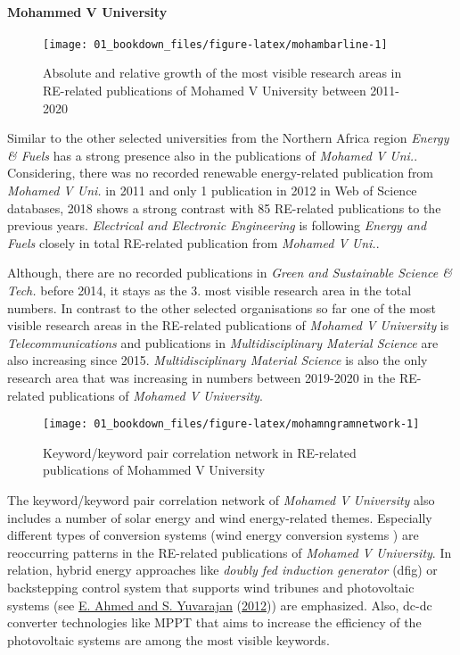 \documentclass[12pt,twoside]{report}
\let\oldparagraph\paragraph
\renewcommand{\paragraph}[1]{\oldparagraph{#1}\mbox{}}
\begin{document}
\hypertarget{mohammed-v-university}{%
\paragraph{Mohammed V University}\label{mohammed-v-university}}

\begin{figure}
\texttt{[image: 01\_bookdown\_files/figure-latex/mohambarline-1]} \caption{Absolute and relative growth of the most visible research areas in RE-related publications of Mohamed V University between 2011-2020}\label{fig:mohambarline}
\end{figure}

Similar to the other selected universities from the Northern Africa region \emph{Energy \& Fuels} has a strong presence also in the publications of \emph{Mohamed V Uni.}. Considering, there was no recorded renewable energy-related publication from \emph{Mohamed V Uni.} in 2011 and only 1 publication in 2012 in Web of Science databases, 2018 shows a strong contrast with 85 RE-related publications to the previous years. \emph{Electrical and Electronic Engineering} is following \emph{Energy and Fuels} closely in total RE-related publication from \emph{Mohamed V Uni.}.

Although, there are no recorded publications in \emph{Green and Sustainable Science \& Tech.} before 2014, it stays as the 3. most visible research area in the total numbers. In contrast to the other selected organisations so far one of the most visible research areas in the RE-related publications of \emph{Mohamed V University} is \emph{Telecommunications} and publications in \emph{Multidisciplinary Material Science} are also increasing since 2015. \emph{Multidisciplinary Material Science} is also the only research area that was increasing in numbers between 2019-2020 in the RE-related publications of \emph{Mohamed V University}.

\begin{figure}
\texttt{[image: 01\_bookdown\_files/figure-latex/mohamngramnetwork-1]} \caption{Keyword/keyword pair correlation network in RE-related publications of Mohammed V University}\label{fig:mohamngramnetwork}
\end{figure}

The keyword/keyword pair correlation network of \emph{Mohamed V University} also includes a number of solar energy and wind energy-related themes. Especially different types of conversion systems (wind energy conversion systems ) are reoccurring patterns in the RE-related publications of \emph{Mohamed V University}. In relation, hybrid energy approaches like \emph{doubly fed induction generator} (dfig) or backstepping control system that supports wind tribunes and photovoltaic systems (see \protect\hyperlink{ref-e.ahmed2012}{E. Ahmed and S. Yuvarajan} (\protect\hyperlink{ref-e.ahmed2012}{2012})) are emphasized. Also, dc-dc converter technologies like MPPT that aims to increase the efficiency of the photovoltaic systems are among the most visible keywords.
\end{document}
